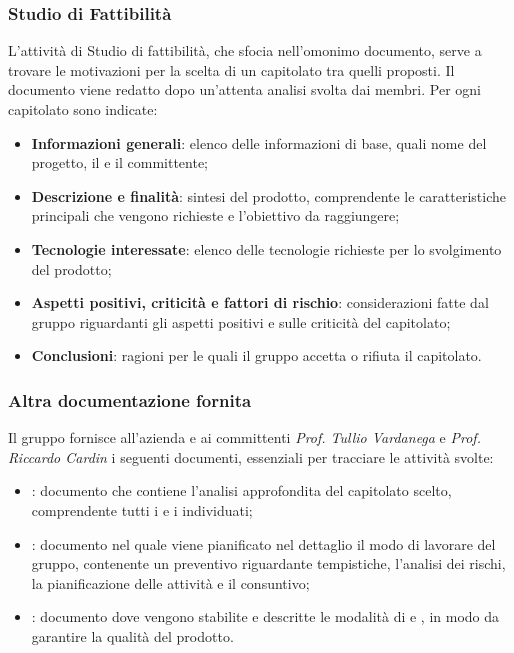 \subsubsection{Studio di Fattibilità}
L'attività di Studio di fattibilità, che sfocia nell'omonimo documento, serve a trovare le motivazioni per la scelta di un capitolato tra quelli proposti.
Il documento \SdF{} viene redatto dopo un'attenta analisi svolta dai membri.
Per ogni capitolato sono indicate:
\begin{itemize}
	\item \textbf{Informazioni generali}: elenco delle informazioni di base, quali nome del progetto, il  e il committente;
	\item \textbf{Descrizione e finalità}: sintesi del prodotto, comprendente le caratteristiche principali che vengono richieste e l'obiettivo da raggiungere;
	\item \textbf{Tecnologie interessate}: elenco delle tecnologie richieste per lo svolgimento del prodotto;
	\item \textbf{Aspetti positivi, criticità e fattori di rischio}: considerazioni fatte dal gruppo riguardanti gli aspetti positivi e sulle criticità del capitolato;
	\item \textbf{Conclusioni}: ragioni per le quali il gruppo accetta o rifiuta il capitolato.
\end{itemize}

\subsubsection{Altra documentazione fornita}

Il gruppo fornisce all'azienda \proponente{} e ai committenti \textit{Prof. Tullio Vardanega} e \textit{Prof. Riccardo Cardin} i seguenti documenti, essenziali per tracciare le attività svolte:
\begin{itemize}
	\item \textbf{\AdR{}}: documento che contiene l'analisi approfondita del capitolato scelto, comprendente tutti i  e i  individuati;
	\item \textbf{\PdP{}}: documento nel quale viene pianificato nel dettaglio il modo di lavorare del gruppo, contenente un preventivo riguardante tempistiche, l'analisi dei rischi, la pianificazione delle attività e il consuntivo;
	\item \textbf{\PdQ{}}: documento dove vengono stabilite e descritte le modalità di  e , in modo da garantire la qualità del prodotto.
\end{itemize}

